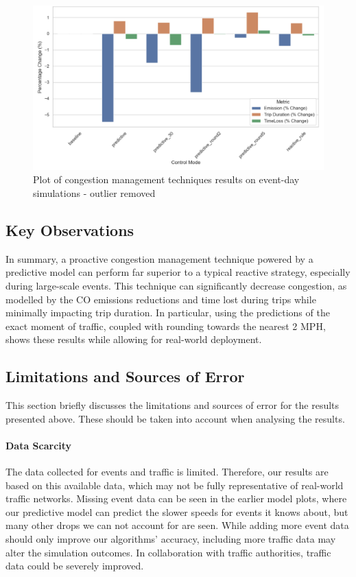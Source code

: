 \begin{figure}[!ht]
  \centering
  \includegraphics[width=\textwidth]{images/results-discussions/event-sims-reduced.pdf}
  \caption{Plot of congestion management techniques results on event-day simulations - outlier removed}
  \label{fig:event-sims-reduced}
\end{figure}

\subsection{Key Observations}
In summary, a proactive congestion management technique powered by a predictive model can perform far superior to a typical reactive strategy, especially during large-scale events. This technique can significantly decrease congestion, as modelled by the CO emissions reductions and time lost during trips while minimally impacting trip duration. In particular, using the predictions of the exact moment of traffic, coupled with rounding towards the nearest 2 MPH, shows these results while allowing for real-world deployment.

\subsection{Limitations and Sources of Error}
This section briefly discusses the limitations and sources of error for the results presented above. These should be taken into account when analysing the results.

\paragraph{Data Scarcity} The data collected for events and traffic is limited. Therefore, our results are based on this available data, which may not be fully representative of real-world traffic networks. Missing event data can be seen in the earlier model plots, where our predictive model can predict the slower speeds for events it knows about, but many other drops we can not account for are seen. While adding more event data should only improve our algorithms’ accuracy, including more traffic data may alter the simulation outcomes. In collaboration with traffic authorities, traffic data could be severely improved.

